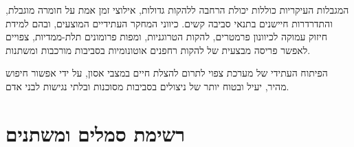 המגבלות העיקריות כוללות יכולת הרחבה ללהקות גדולות, אילוצי זמן אמת על חומרה מוגבלת, והתדרדרות חיישנים בתנאי סביבה קשים. כיווני המחקר העתידיים המוצעים, ובהם למידת חיזוק עמוקה לכיוונון פרמטרים, להקות הטרוגניות, ומפות פרומונים תלת-ממדיות, צפויים לאפשר פריסה מבצעית של להקות רחפנים אוטונומיות בסביבות מורכבות ומשתנות.

הפיתוח העתידי של מערכת  צפוי לתרום להצלת חיים במצבי אסון, על ידי אפשור חיפוש מהיר, יעיל ובטוח יותר של ניצולים בסביבות מסוכנות ובלתי נגישות לבני אדם.

\cite{Coppola2020Swarming, Chung2018Swarm, Nedjah2022DRL, Lajoie2023SwarmSLAM, Kalman1960, Yan2020Survey}

\appendix
\section{רשימת סמלים ומשתנים}
\label{sec:ch09_appendix}

